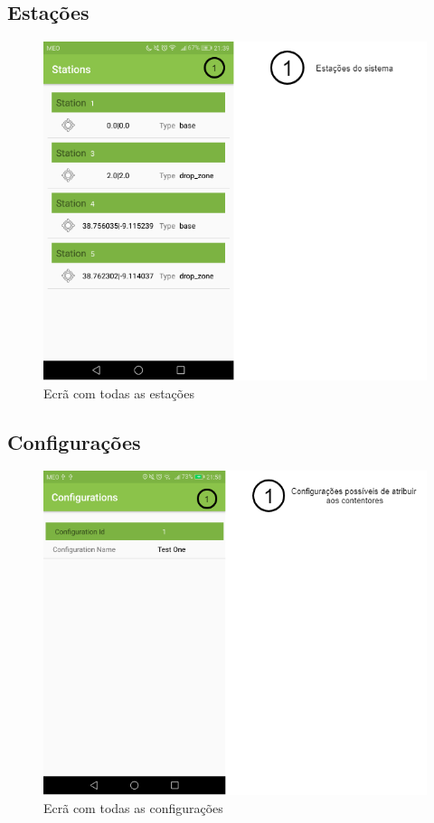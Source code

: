 \documentclass[10pt,a5paper]{article}
\begin{document}
\newpage
\subsection{Estações} 

\begin{figure}[!h]
	\centering
	\includegraphics[width=1.1\textwidth]{Images/screens/stations_screen}
	\caption{Ecrã com todas as estações}
	\label{fig:stations_screen}
\end{figure}

\newpage
\subsection{Configurações} 

\begin{figure}[!h]
	\centering
	\includegraphics[width=1.1\textwidth]{Images/screens/configurations_screen}
	\caption{Ecrã com todas as configurações}
	\label{fig:configurations_screen}
\end{figure}
\end{document}
